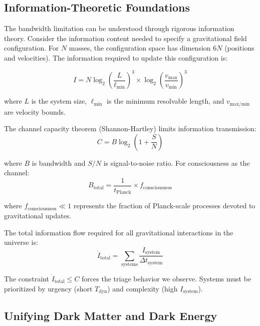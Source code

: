 \documentclass[twocolumn,prd,amsmath,amssymb,aps,superscriptaddress,nofootinbib]{revtex4-2}
\begin{document}
\subsection{Information-Theoretic Foundations}

The bandwidth limitation can be understood through rigorous information theory. Consider the information content needed to specify a gravitational field configuration. For $N$ masses, the configuration space has dimension $6N$ (positions and velocities). The information required to update this configuration is:

\begin{equation}
I = N \log_2\left(\frac{L}{\ell_{\text{min}}}\right)^3 \times \log_2\left(\frac{v_{\text{max}}}{v_{\text{min}}}\right)^3
\end{equation}

where $L$ is the system size, $\ell_{\text{min}}$ is the minimum resolvable length, and $v_{\text{max/min}}$ are velocity bounds.

The channel capacity theorem (Shannon-Hartley) limits information transmission:
\begin{equation}
C = B \log_2\left(1 + \frac{S}{N}\right)
\end{equation}

where $B$ is bandwidth and $S/N$ is signal-to-noise ratio. For consciousness as the channel:
\begin{equation}
B_{\text{total}} = \frac{1}{t_{\text{Planck}}} \times f_{\text{consciousness}}
\end{equation}

where $f_{\text{consciousness}} \ll 1$ represents the fraction of Planck-scale processes devoted to gravitational updates.

The total information flow required for all gravitational interactions in the universe is:
\begin{equation}
\dot{I}_{\text{total}} = \sum_{\text{systems}} \frac{I_{\text{system}}}{\Delta t_{\text{system}}}
\end{equation}

The constraint $\dot{I}_{\text{total}} \leq C$ forces the triage behavior we observe. Systems must be prioritized by urgency (short $T_{\text{dyn}}$) and complexity (high $I_{\text{system}}$).

\subsection{Unifying Dark Matter and Dark Energy}
\end{document}
